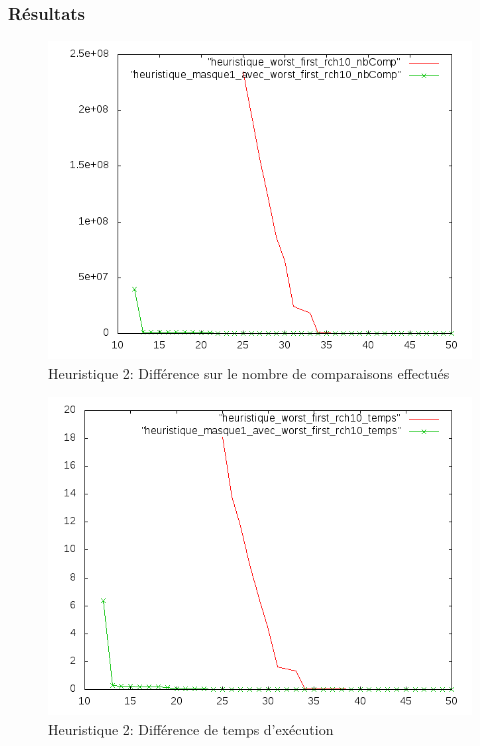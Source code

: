 \documentclass[a4paper,10pt]{article}
\begin{document}
\subsubsection*{Résultats}
\begin{figure}[H]
\begin{center}
\includegraphics[scale=0.6]{./graphique/diff2_nbComp.png}
\end{center}
\caption{Heuristique 2: Différence sur le nombre de comparaisons effectués}
\end{figure}
\begin{figure}[H]
\begin{center}
\includegraphics[scale=0.6]{./graphique/diff2_temps.png}
\end{center}
\caption{Heuristique 2: Différence de temps d'exécution}
\end{figure}
\end{document}
